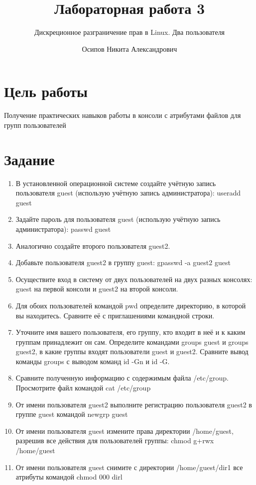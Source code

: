 \documentclass[
  english,
  russian,
  12pt,
  a4paper,
  DIV=11,
  numbers=noendperiod]{scrreprt}
\title{Лабораторная работа 3}
\subtitle{Дискреционное разграничение прав в Linux. Два пользователя}
\author{Осипов Никита Александрович}
\date{}
\renewcommand*\contentsname{Содержание}
\newcommand\contentsname{Содержание}
\begin{document}
\maketitle

\renewcommand*\contentsname{Содержание}
{
\setcounter{tocdepth}{1}
\tableofcontents
}
\listoffigures
\listoftables

\chapter{Цель
работы}\label{ux446ux435ux43bux44c-ux440ux430ux431ux43eux442ux44b}

Получение практических навыков работы в консоли с атрибутами файлов для
групп пользователей

\chapter{Задание}\label{ux437ux430ux434ux430ux43dux438ux435}

\begin{enumerate}
\def\labelenumi{\arabic{enumi}.}
\item
  В установленной операционной системе создайте учётную запись
  пользователя guest (использую учётную запись администратора): useradd
  guest
\item
  Задайте пароль для пользователя guest (использую учётную запись
  администратора): passwd guest
\item
  Аналогично создайте второго пользователя guest2.
\item
  Добавьте пользователя guest2 в группу guest: gpasswd -a guest2 guest
\item
  Осуществите вход в систему от двух пользователей на двух разных
  консолях: guest на первой консоли и guest2 на второй консоли.
\item
  Для обоих пользователей командой pwd определите директорию, в которой
  вы находитесь. Сравните её с приглашениями командной строки.
\item
  Уточните имя вашего пользователя, его группу, кто входит в неё и к
  каким группам принадлежит он сам. Определите командами groups guest и
  groups guest2, в какие группы входят пользователи guest и guest2.
  Сравните вывод команды groups с выводом команд id -Gn и id -G.
\item
  Сравните полученную информацию с содержимым файла /etc/group.
  Просмотрите файл командой cat /etc/group
\item
  От имени пользователя guest2 выполните регистрацию пользователя guest2
  в группе guest командой newgrp guest
\item
  От имени пользователя guest измените права директории /home/guest,
  разрешив все действия для пользователей группы: chmod g+rwx
  /home/guest
\item
  От имени пользователя guest снимите с директории /home/guest/dir1 все
  атрибуты командой chmod 000 dirl
\end{enumerate}
\end{document}
